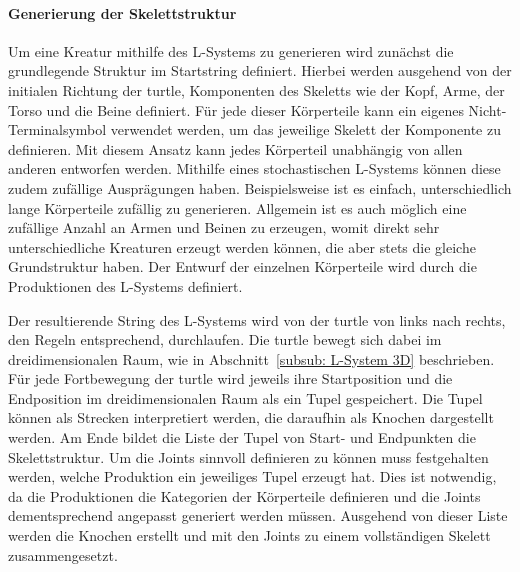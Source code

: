 \paragraph{Generierung der Skelettstruktur}
Um eine Kreatur mithilfe des L-Systems zu generieren wird zunächst die grundlegende Struktur im Startstring definiert.
Hierbei werden ausgehend von der initialen Richtung der turtle, Komponenten des Skeletts wie der Kopf, Arme, der Torso und die Beine definiert.
Für jede dieser Körperteile kann ein eigenes Nicht-Terminalsymbol verwendet werden, um das jeweilige Skelett der Komponente zu definieren.
Mit diesem Ansatz kann jedes Körperteil unabhängig von allen anderen entworfen werden.
Mithilfe eines stochastischen L-Systems können diese zudem zufällige Ausprägungen haben.
Beispielsweise ist es einfach, unterschiedlich lange Körperteile zufällig zu generieren.
Allgemein ist es auch möglich eine zufällige Anzahl an Armen und Beinen zu erzeugen, womit direkt sehr unterschiedliche Kreaturen erzeugt werden können, die aber stets die gleiche Grundstruktur haben.
Der Entwurf der einzelnen Körperteile wird durch die Produktionen des L-Systems definiert.

Der resultierende String des L-Systems wird von der turtle von links nach rechts, den Regeln entsprechend, durchlaufen.
Die turtle bewegt sich dabei im dreidimensionalen Raum, wie in Abschnitt~\ref{subsub: L-System 3D} beschrieben.
Für jede Fortbewegung der turtle wird jeweils ihre Startposition und die Endposition im dreidimensionalen Raum als ein Tupel gespeichert.
Die Tupel können als Strecken interpretiert werden, die daraufhin als Knochen dargestellt werden.
Am Ende bildet die Liste der Tupel von Start- und Endpunkten die Skelettstruktur.
Um die Joints sinnvoll definieren zu können muss festgehalten werden, welche Produktion ein jeweiliges Tupel erzeugt hat.
Dies ist notwendig, da die Produktionen die Kategorien der Körperteile definieren und die Joints dementsprechend angepasst generiert werden müssen.
Ausgehend von dieser Liste werden die Knochen erstellt und mit den Joints zu einem vollständigen Skelett zusammengesetzt.

